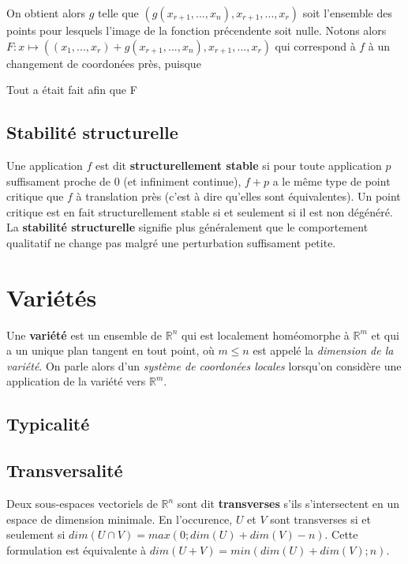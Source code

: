\documentclass{article}
\begin{document}
On obtient alors $g$ telle que $(g(x_{r+1},...,x_n),x_{r+1},...,x_{r})$ soit l'ensemble des points pour lesquels l'image de la fonction précendente soit nulle. Notons alors $F: x\mapsto ((x_1,...,x_r)+g(x_{r+1},...,x_n),x_{r+1},...,x_{r})$ qui correspond à $f$ à un changement de coordonées près, puisque

Tout a était fait afin que F

\subsection{Stabilité structurelle}

Une application $f$ est dit \textbf{structurellement stable} si pour toute application $p$ suffisament proche de 0 (et infiniment continue), $f+p$ a le même type de point critique que $f$ à translation près (c'est à dire qu'elles sont équivalentes). Un point critique est en fait structurellement stable si et seulement si il est non dégénéré.
La \textbf{stabilité structurelle} signifie plus généralement que le comportement qualitatif ne change pas malgré une perturbation suffisament petite.

\section{Variétés}

Une \textbf{variété} est un ensemble de $\mathbb{R}^n$ qui est localement homéomorphe à $\mathbb{R}^m$ et qui a un unique plan tangent en tout point, où $m\leq n$ est appelé la \textit{dimension de la variété}. On parle alors d'un \textit{système de coordonées locales} lorsqu'on considère une application de la variété vers $\mathbb{R}^m$.

\subsection{Typicalité}



\subsection{Transversalité}

Deux sous-espaces vectoriels de $\mathbb{R}^n$ sont dit \textbf{transverses} s'ils s'intersectent en un espace de dimension minimale. En l'occurence, $U$ et $V$ sont transverses si et seulement si $dim(U\cap V)=max(0;dim(U)+dim(V)-n)$. Cette formulation est équivalente à $dim(U+V)=min(dim(U)+dim(V); n)$.
\end{document}
